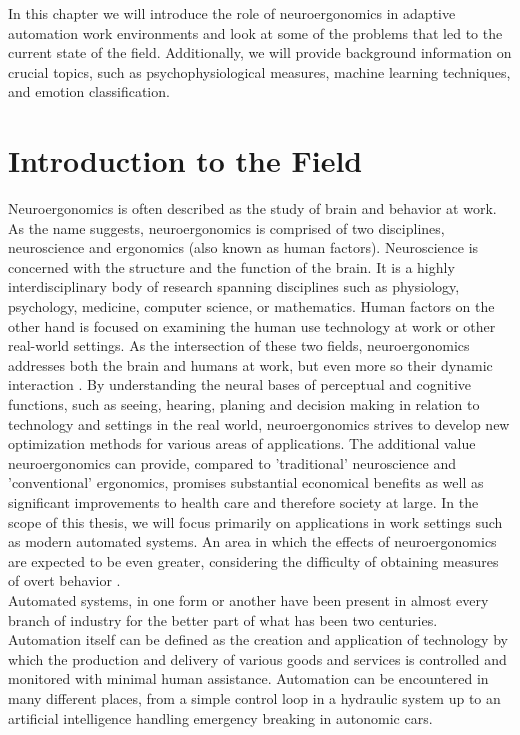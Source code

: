 
In this chapter we will introduce the role of neuroergonomics in adaptive automation work environments and look at some of the problems that led to the current state of the field. Additionally, we will provide background information  on crucial topics, such as psychophysiological measures, machine learning techniques, and emotion classification.

\section{Introduction to the Field}
Neuroergonomics is often described as the study of brain and behavior at work. As the name suggests, neuroergonomics is comprised of two disciplines, neuroscience and ergonomics (also known as human factors). Neuroscience is concerned with the structure and the function of the brain. It is a highly interdisciplinary body of research spanning disciplines such as physiology, psychology, medicine, computer science, or mathematics. Human factors on the other hand is focused on examining the human use technology at work or other real-world settings. As the intersection of these two fields, neuroergonomics addresses both the brain and humans at work, but even more so their dynamic interaction \cite{Parasuraman2003}
. By understanding the neural bases of perceptual and cognitive functions, such as seeing, hearing, planing and decision making in relation to technology and settings in the real world, neuroergonomics strives to develop new optimization methods for various areas of applications. The additional value neuroergonomics can provide, compared to 'traditional' neuroscience and 'conventional' ergonomics, promises substantial economical benefits as well as significant improvements to health care and therefore society at large. 
In the scope of this thesis, we will focus primarily on applications in work settings such as modern automated systems. An area in which the effects of neuroergonomics are expected to be even greater, considering the difficulty of obtaining measures of overt behavior \cite{Parasuraman2003}.\\
Automated systems, in one form or another have been present in almost every branch of industry for the better part of what has been two centuries. Automation itself can be defined as the creation and application of technology by which the production and delivery of various goods and services is controlled and monitored with minimal human assistance. Automation can be encountered in many different places, from a simple control loop in a hydraulic system up to an artificial intelligence handling emergency breaking in autonomic cars.%
